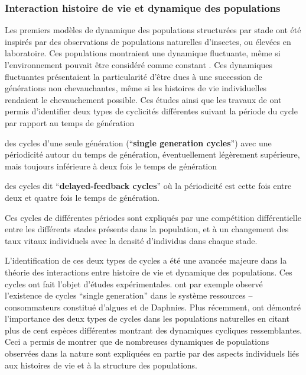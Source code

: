 \subsubsection{Interaction histoire de vie et dynamique des populations}
\label{modelPopStru}
Les premiers modèles de dynamique des populations structurées par stade
\autocites{gurney1980a,gurney1983a,nisbet1983a,lawton1981a} ont été inspirés par
des observations de populations naturelles d'insectes, ou élevées en
laboratoire.
Ces populations montraient une dynamique fluctuante, même si l'environnement
pouvait être considéré comme constant
\autocites{nicholson1954a,gurney1983a,ebenman1988a,godfray1989a}. Ces dynamiques
fluctuantes présentaient la particularité d'être dues à une succession de
générations non chevauchantes, même si les histoires de vie individuelles
rendaient le chevauchement possible. Ces études ainsi que les travaux de
\textcite{gurney1985a} ont permis d'identifier deux types de cyclicités
différentes suivant la période du cycle par rapport au temps de génération
\begin{enumerate*}[label=(\roman*), before=\unskip{ : }, itemjoin={{ ; }},
itemjoin*={{ ; et }}]
  \item des cycles d'une seule génération (``\textbf{single generation
  cycles}'') avec une périodicité autour du temps de génération, éventuellement légèrement
  supérieure, mais toujours inférieure à deux fois le temps de génération \item
  des cycles dit ``\textbf{delayed-feedback cycles}'' où la périodicité est
  cette fois entre deux et quatre fois le temps de génération.
\end{enumerate*} 
Ces cycles de différentes périodes sont expliqués par une compétition
différentielle entre les différents stades présents dans la population, et à un
changement des taux vitaux individuels avec la densité d'individus dans chaque
stade.

L'identification de ces deux types de cycles a été une avancée majeure dans la
théorie des interactions entre histoire de vie et dynamique des populations. 
Ces cycles ont fait l'objet d'études expérimentales.
\textcite{mccauley1987a} ont par exemple observé l'existence de cycles ``single
generation'' dans le système ressources -- consommateurs constitué d'algues et
de Daphnies. Plus récemment, \textcite{murdoch2002a} ont démontré l'importance des
deux types de cycles dans les populations naturelles en citant plus de cent
espèces différentes montrant des dynamiques cycliques ressemblantes. Ceci a
permis de montrer que de nombreuses dynamiques de populations observées dans
la nature sont expliquées en partie par des aspects individuels liés aux
histoires de vie et à la structure des populations.

